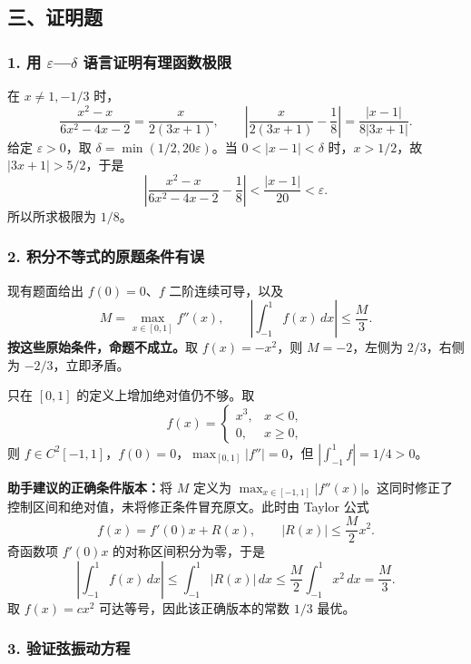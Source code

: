 \documentclass[11pt,fontset=fandol]{ctexart}
\begin{document}
\subsection{三、证明题}\label{ux4e09ux8bc1ux660eux9898}

\subsubsection{\texorpdfstring{1. 用 \(\varepsilon\)---\(\delta\)
语言证明有理函数极限}{1. 用 \textbackslash varepsilon---\textbackslash delta 语言证明有理函数极限}}\label{ux7528-varepsilondelta-ux8bedux8a00ux8bc1ux660eux6709ux7406ux51fdux6570ux6781ux9650}

在 \(x\ne1,-1/3\) 时， \[
\frac{x^2-x}{6x^2-4x-2}=\frac{x}{2(3x+1)},\qquad
\left|\frac{x}{2(3x+1)}-\frac18\right|
=\frac{|x-1|}{8|3x+1|}.
\] 给定 \(\varepsilon>0\)，取 \(\delta=\min(1/2,20\varepsilon)\)。当
\(0<|x-1|<\delta\) 时，\(x>1/2\)，故 \(|3x+1|>5/2\)，于是 \[
\left|\frac{x^2-x}{6x^2-4x-2}-\frac18\right|
<\frac{|x-1|}{20}<\varepsilon.
\] 所以所求极限为 \(1/8\)。

\subsubsection{2.
积分不等式的原题条件有误}\label{ux79efux5206ux4e0dux7b49ux5f0fux7684ux539fux9898ux6761ux4ef6ux6709ux8bef}

现有题面给出 \(f(0)=0\)、\(f\) 二阶连续可导，以及 \[
M=\max_{x\in[0,1]}f''(x),\qquad
\left|\int_{-1}^1f(x)\,dx\right|\le\frac M3.
\] \textbf{按这些原始条件，命题不成立。}取 \(f(x)=-x^2\)，则
\(M=-2\)，左侧为 \(2/3\)，右侧为 \(-2/3\)，立即矛盾。

只在 \([0,1]\) 的定义上增加绝对值仍不够。取 \[
f(x)=\begin{cases}x^3,&x<0,\\0,&x\ge0,\end{cases}
\] 则 \(f\in C^2[-1,1]\)，\(f(0)=0\)，\(\max_{[0,1]}|f''|=0\)，但
\(|\int_{-1}^1f|=1/4>0\)。

\textbf{助手建议的正确条件版本：}将 \(M\) 定义为
\(\max_{x\in[-1,1]}|f''(x)|\)。这同时修正了控制区间和绝对值，未将修正条件冒充原文。此时由
Taylor 公式 \[
f(x)=f'(0)x+R(x),\qquad |R(x)|\le\frac M2x^2.
\] 奇函数项 \(f'(0)x\) 的对称区间积分为零，于是 \[
\left|\int_{-1}^1f(x)\,dx\right|
\le\int_{-1}^1|R(x)|\,dx
\le\frac M2\int_{-1}^1x^2\,dx=\frac M3.
\] 取 \(f(x)=cx^2\) 可达等号，因此该正确版本的常数 \(1/3\) 最优。

\subsubsection{3.
验证弦振动方程}\label{ux9a8cux8bc1ux5f26ux632fux52a8ux65b9ux7a0b}
\end{document}
